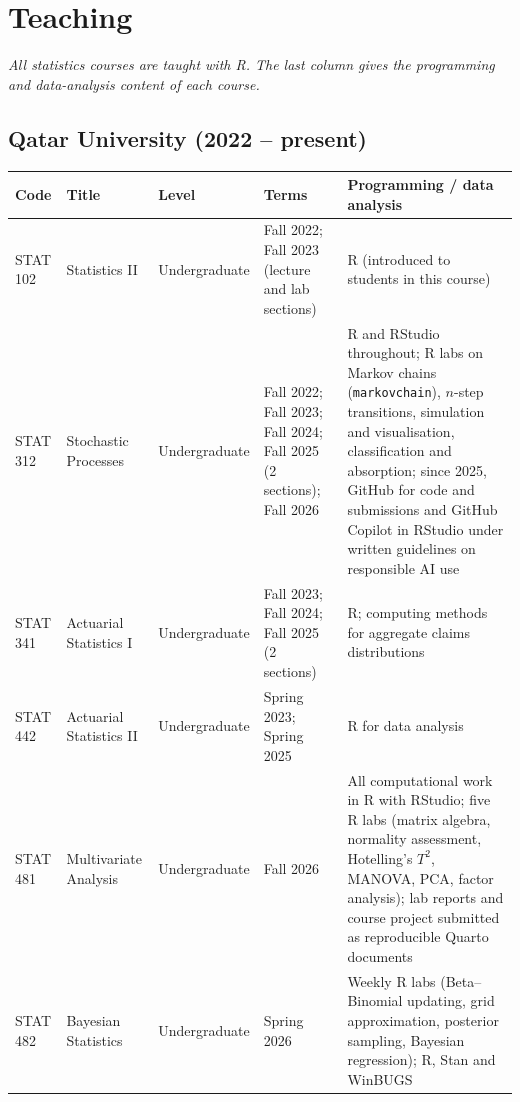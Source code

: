 \documentclass[10pt,a4paper]{article}
\begin{document}
\section{Teaching}
\textit{All statistics courses are taught with R. The last column gives the programming and data-analysis content of each course.}

\subsection{Qatar University (2022 -- present)}
{\small
\begin{longtable}{@{}>{\raggedright\arraybackslash}p{1.45cm}>{\raggedright\arraybackslash}p{3.3cm}>{\raggedright\arraybackslash}p{2.0cm}>{\raggedright\arraybackslash}p{3.0cm}>{\raggedright\arraybackslash}p{\dimexpr\textwidth-10.55cm-8\tabcolsep\relax}@{}}
\toprule
\textbf{Code} & \textbf{Title} & \textbf{Level} & \textbf{Terms} & \textbf{Programming / data analysis}\\
\midrule\endhead
\bottomrule\endfoot
STAT 102 & Statistics II & Undergraduate & Fall 2022; Fall 2023 (lecture and lab sections) & R (introduced to students in this course)\\
STAT 312 & Stochastic Processes & Undergraduate & Fall 2022; Fall 2023; Fall 2024; Fall 2025 (2 sections); Fall 2026 &
 R and RStudio throughout; R labs on Markov chains (\texttt{markov\-chain}), $n$-step transitions, simulation and
 visualisation, classification and absorption; since 2025, GitHub for code and submissions and GitHub Copilot in
 RStudio under written guidelines on responsible AI use\\
STAT 341 & Actuarial Statistics I & Undergraduate & Fall 2023; Fall 2024; Fall 2025 (2 sections) & R; computing methods for aggregate claims distributions\\
STAT 442 & Actuarial Statistics II & Undergraduate & Spring 2023; Spring 2025 & R for data analysis\\
STAT 481 & Multivariate Analysis & Undergraduate & Fall 2026 & All computational work in R with RStudio; five R labs
 (matrix algebra, normality assessment, Hotelling's $T^2$, MANOVA, PCA, factor analysis); lab reports and course
 project submitted as reproducible Quarto documents\\
STAT 482 & Bayesian Statistics & Undergraduate & Spring 2026 & Weekly R labs (Beta--Binomial updating, grid
 approximation, posterior sampling, Bayesian regression); R, Stan and WinBUGS\\

\end{longtable}}
\end{document}
